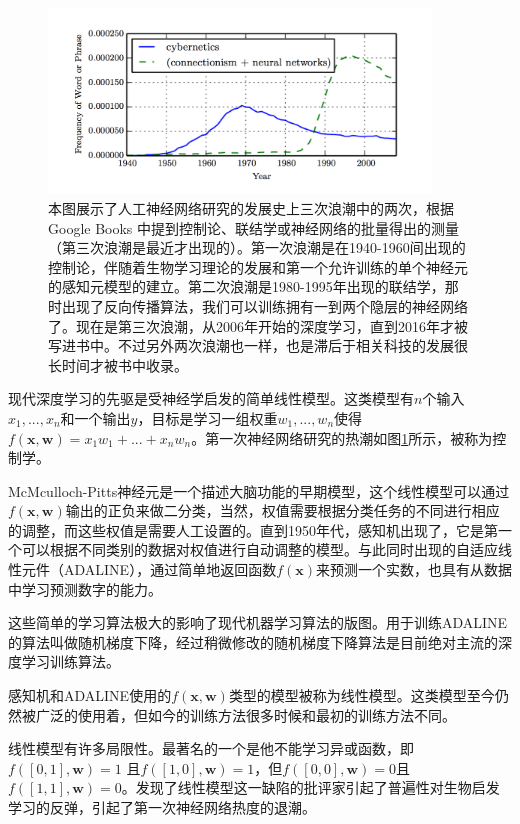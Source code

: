 \documentclass[a4paper,11pt]{book}
\begin{document}
\begin{figure}[htbp] %
   \centering
   \includegraphics[width=4in]{fig/chap1/1.7.png} 
   \caption{本图展示了人工神经网络研究的发展史上三次浪潮中的两次，根据Google Books 中提到控制论、联结学或神经网络的批量得出的测量（第三次浪潮是最近才出现的）。第一次浪潮是在1940-1960间出现的控制论，伴随着生物学习理论的发展和第一个允许训练的单个神经元的感知元模型的建立。第二次浪潮是1980-1995年出现的联结学，那时出现了反向传播算法，我们可以训练拥有一到两个隐层的神经网络了。现在是第三次浪潮，从2006年开始的深度学习，直到2016年才被写进书中。不过另外两次浪潮也一样，也是滞后于相关科技的发展很长时间才被书中收录。}
   \label{fig:1.7}
\end{figure}


现代深度学习的先驱是受神经学启发的简单线性模型。这类模型有$n$个输入$x_1,...,x_n$和一个输出$y$，目标是学习一组权重$w_1,...,w_n$使得$f(\textbf{x},\textbf{w}) =x_1w_1+...+x_nw_n$。第一次神经网络研究的热潮如图\ref{fig:1.7}所示，被称为控制学。

McMculloch-Pitts神经元是一个描述大脑功能的早期模型，这个线性模型可以通过$f(\textbf{x},\textbf{w})$输出的正负来做二分类，当然，权值需要根据分类任务的不同进行相应的调整，而这些权值是需要人工设置的。直到1950年代，感知机出现了，它是第一个可以根据不同类别的数据对权值进行自动调整的模型。与此同时出现的自适应线性元件（ADALINE），通过简单地返回函数$f(\textbf{x})$来预测一个实数，也具有从数据中学习预测数字的能力。

这些简单的学习算法极大的影响了现代机器学习算法的版图。用于训练ADALINE的算法叫做随机梯度下降，经过稍微修改的随机梯度下降算法是目前绝对主流的深度学习训练算法。


感知机和ADALINE使用的$f(\textbf{x},\textbf{w})$类型的模型被称为线性模型。这类模型至今仍然被广泛的使用着，但如今的训练方法很多时候和最初的训练方法不同。


线性模型有许多局限性。最著名的一个是他不能学习异或函数，即$f([0,1],\textbf{w}) =1$ 且$f([1,0],\textbf{w}) =1$，但$f([0,0],\textbf{w}) =0$且$f([1,1],\textbf{w}) =0$。发现了线性模型这一缺陷的批评家引起了普遍性对生物启发学习的反弹，引起了第一次神经网络热度的退潮。
\end{document}
